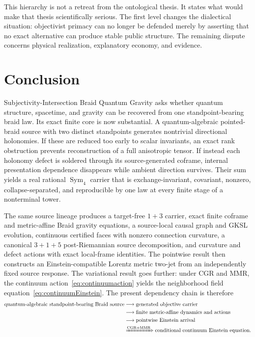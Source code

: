 \documentclass[11pt]{article}
\theoremstyle{definition}
\theoremstyle{remark}
\newcommand{\Sym}{\operatorname{Sym}}
\begin{document}
This hierarchy is not a retreat from the ontological thesis. It states what would make that thesis scientifically serious. The first level changes the dialectical situation: objectivist primacy can no longer be defended merely by asserting that no exact alternative can produce stable public structure. The remaining dispute concerns physical realization, explanatory economy, and evidence.

\section{Conclusion}

Subjectivity-Intersection Braid Quantum Gravity asks whether quantum structure, spacetime, and gravity can be recovered from one standpoint-bearing braid law. Its exact finite core is now substantial. A quantum-algebraic pointed-braid source with two distinct standpoints generates nontrivial directional holonomies. If these are reduced too early to scalar invariants, an exact rank obstruction prevents reconstruction of a full anisotropic tensor. If instead each holonomy defect is soldered through its source-generated coframe, internal presentation dependence disappears while ambient direction survives. Their sum yields a real rational $\Sym_4$ carrier that is exchange-invariant, covariant, nonzero, collapse-separated, and reproducible by one law at every finite stage of a nonterminal tower.

The same source lineage produces a target-free $1+3$ carrier, exact finite coframe and metric-affine Braid gravity equations, a source-local causal graph and GKSL evolution, continuous certified faces with nonzero connection curvature, a canonical $3+1+5$ post-Riemannian source decomposition, and curvature and defect actions with exact local-frame identities. The pointwise result then constructs an Einstein-compatible Lorentz metric two-jet from an independently fixed source response. The variational result goes further: under CGR and MMR, the continuum action~\eqref{eq:continuumaction} yields the neighborhood field equation~\eqref{eq:continuumEinstein}. The present dependency chain is therefore
\[
 \begin{aligned}
 \text{quantum-algebraic standpoint-bearing Braid source}
 &\longrightarrow \text{generated objective carrier}\\
 &\longrightarrow \text{finite metric-affine dynamics and actions}\\
 &\longrightarrow \text{pointwise Einstein arrival}\\
 &\xRightarrow{\mathrm{CGR+MMR}} \text{conditional continuum Einstein equation}.
 \end{aligned}
\]
\end{document}
